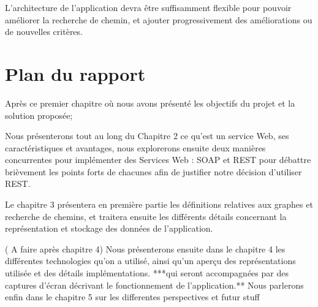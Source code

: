L'architecture de l'application devra être suffisamment flexible pour pouvoir améliorer la recherche de chemin, et ajouter progressivement des améliorations ou de nouvelles critères.
	 
\section{Plan du rapport}

Après ce premier chapitre où nous avons présenté les objectifs du projet et la solution proposée; 

Nous présenterons tout au long du Chapitre 2 ce qu'est un service Web, ses caractéristiques et avantages, nous explorerons ensuite deux manières concurrentes pour implémenter des Services Web : SOAP et REST pour débattre brièvement les points forts de chacunes afin de justifier notre décision d'utiliser REST.

Le chapitre 3 présentera en première partie les définitions relatives aux graphes et recherche de chemins, et traitera ensuite les différents détails concernant la représentation et stockage des données de l'application. 

( A faire après chapitre 4) \newline
Nous présenterons ensuite dans le chapitre 4 les différentes technologies qu'on a utilisé, ainsi qu'un aperçu des représentations utilisée et des détails implémentations. ***qui seront accompagnées par des captures d'écran décrivant le fonctionnement de l'application.**
Nous parlerons enfin dans le chapitre 5 sur les differentes perspectives et futur stuff
